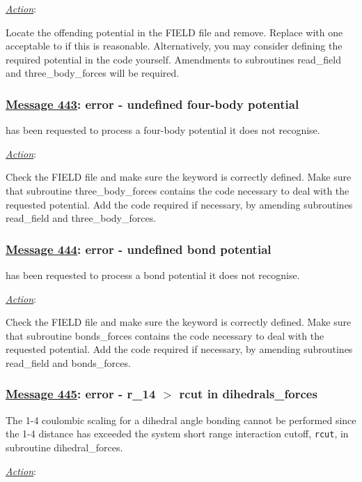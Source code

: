 \noindent \underline{\em Action}:

Locate the offending potential in the FIELD file and remove.
Replace with one acceptable to \D if this is reasonable.
Alternatively, you may consider defining the required potential in
the code yourself. Amendments to subroutines {\sc read\_field} and
{\sc three\_body\_forces} will be required.

\subsubsection*{\underline{Message 443}: error - undefined four-body potential}

\D has been requested to process a four-body
potential it does not recognise.

\noindent \underline{\em Action}:

Check the FIELD file and make sure the keyword is correctly
defined.  Make sure that subroutine {\sc three\_body\_forces}
contains the code necessary to deal with the requested potential.
Add the code required if necessary, by amending subroutines {\sc
read\_field} and {\sc three\_body\_forces}.

\subsubsection*{\underline{Message 444}: error - undefined bond potential}

\D has been requested to process a bond
potential it does not recognise.

\noindent \underline{\em Action}:

Check the FIELD file and make sure the keyword is correctly
defined. Make sure that subroutine {\sc bonds\_forces} contains
the code necessary to deal with the requested potential.  Add the
code required if necessary, by amending subroutines {\sc
read\_field} and {\sc bonds\_forces}.

\subsubsection*{\underline{Message 445}: error - r\_14 $>$ rcut in dihedrals\_forces}

The 1-4 coulombic scaling for a dihedral angle bonding cannot be
performed since the 1-4 distance has exceeded the system short range
interaction cutoff, {\tt rcut}, in subroutine {\sc
dihedral\_forces}.

\noindent \underline{\em Action}:

